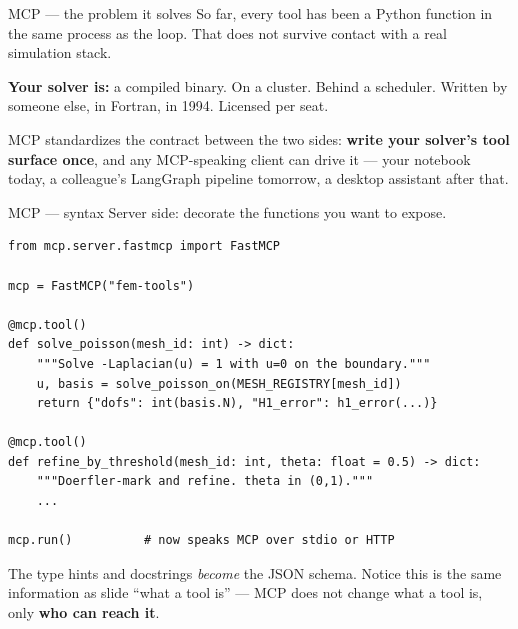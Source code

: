 \documentclass[aspectratio=169,10pt]{beamer}
\newcommand{\hl}[1]{\textcolor{accent}{\textbf{#1}}}
\begin{document}
\begin{frame}{MCP --- the problem it solves}
So far, every tool has been a Python function in the same process as the loop.
That does not survive contact with a real simulation stack.

\vspace{0.8em}
\textbf{Your solver is:} a compiled binary. On a cluster. Behind a scheduler.
Written by someone else, in Fortran, in 1994. Licensed per seat.

\vspace{0.8em}
\begin{center}
\end{center}

\vspace{0.5em}
MCP standardizes the contract between the two sides: \hl{write your solver's
tool surface once}, and any MCP-speaking client can drive it --- your notebook
today, a colleague's LangGraph pipeline tomorrow, a desktop assistant after that.
\end{frame}

\begin{frame}[fragile]{MCP --- syntax}
Server side: decorate the functions you want to expose.

\begin{lstlisting}
from mcp.server.fastmcp import FastMCP

mcp = FastMCP("fem-tools")

@mcp.tool()
def solve_poisson(mesh_id: int) -> dict:
    """Solve -Laplacian(u) = 1 with u=0 on the boundary."""
    u, basis = solve_poisson_on(MESH_REGISTRY[mesh_id])
    return {"dofs": int(basis.N), "H1_error": h1_error(...)}

@mcp.tool()
def refine_by_threshold(mesh_id: int, theta: float = 0.5) -> dict:
    """Doerfler-mark and refine. theta in (0,1)."""
    ...

mcp.run()          # now speaks MCP over stdio or HTTP
\end{lstlisting}

\vspace{0.5em}
The type hints and docstrings \emph{become} the JSON schema. Notice this is the
same information as slide ``what a tool is'' --- MCP does not change what a tool
is, only \hl{who can reach it}.
\end{frame}
\end{document}
